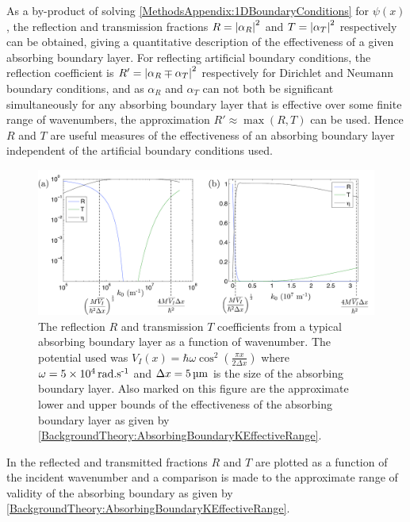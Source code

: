 As a by-product of solving \eqref{MethodsAppendix:1DBoundaryConditions} for $\psi(x)$, the reflection and transmission fractions $R=\left|\alpha_R\right|^2$ and $T=\left|\alpha_T\right|^2$ respectively can be obtained, giving a quantitative description of the effectiveness of a given absorbing boundary layer. For reflecting artificial boundary conditions, the reflection coefficient is $R'= \left|\alpha_R \mp \alpha_T\right|^2$ respectively for Dirichlet and Neumann boundary conditions, and as $\alpha_R$ and $\alpha_T$ can not both be significant simultaneously for any absorbing boundary layer that is effective over some finite range of wavenumbers, the approximation $R' \approx \max(R, T)$ can be used.  Hence $R$ and $T$ are useful measures of the effectiveness of an absorbing boundary layer independent of the artificial boundary conditions used.

\begin{figure}
    \centering
    \includegraphics[width=14cm]{AbsorbingBoundaryLayerEffectiveness}
    \caption{\label{MethodsAppendix:AbsorbingBoundaryLayerEffectiveness} The reflection $R$ and transmission $T$ coefficients from a typical absorbing boundary layer as a function of wavenumber. The potential used was $\displaystyle V_I(x) = \hbar \omega \cos^2\left( \frac{\pi x}{2 \Delta x} \right)$ where $\omega = \unit[5 \times 10^4]{rad.s\textsuperscript{-1}}$ and $\Delta x = \unit[5]{\micro m}$ is the size of the absorbing boundary layer. Also marked on this figure are the approximate lower and upper bounds of the effectiveness of the absorbing boundary layer as given by \eqref{BackgroundTheory:AbsorbingBoundaryKEffectiveRange}.}
\end{figure}

In  the reflected and transmitted fractions $R$ and $T$ are plotted as a function of the incident wavenumber and a comparison is made to the approximate range of validity of the absorbing boundary as given by \eqref{BackgroundTheory:AbsorbingBoundaryKEffectiveRange}. 


